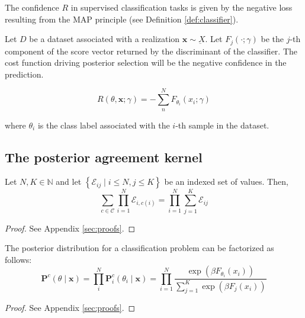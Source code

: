 The confidence $R$ in supervised classification tasks is given by the negative
loss resulting from the MAP principle (see Definition \ref{def:classifier}).

\begin{definition}
    Let $D$ be a dataset associated with a realization $\bm{x} \sim \underbar{X}$. Let $F_j(\cdot; \gamma)$ 
    be the $j$-th component of the score vector returned by the discriminant of the classifier.
    The cost function driving posterior selection will be the negative
    confidence in the prediction.

    $$
    R(\theta, \bm{x}; \gamma) = - \sum_n^N F_{\theta_i}(x_i; \gamma)
    $$

    where $\theta_i$ is the class label associated with the $i$-th sample in the dataset.
\end{definition}

\subsection{The posterior agreement kernel}

\begin{lemma}[Exchangeability]\label{lemma:exchangeability} 
    Let $N, K \in \mathbb{N}$ and let $\left\{\mathcal{E}_{i j} \mid i \leq N, j \leq K\right\}$ be an indexed set of values. Then,
    $$
    \sum_{c \in \mathcal{C}} \prod_{i=1}^N \mathcal{E}_{i, c(i)}=\prod_{i=1}^N \sum_{j=1}^K \mathcal{E}_{i j}
    $$
\end{lemma}

\begin{proof}
    See Appendix \ref{sec:proofs}.
\end{proof}

\begin{theorem}\label{theorem:posterior_factorization}

    The posterior distribution for a classification problem can be factorized as follows:
    $$
    \mathbf{P}^c(\theta \mid \bm{x}) = \prod_i^N  \mathbf{P}_i^c(\theta_i \mid \bm{x}) = \prod_{i=1}^N \frac{\exp \left ( \beta F_{\theta_i}(x_i) \right )}{\sum_{j=1}^K \exp \left ( \beta F_j(x_i) \right )}
    $$
\end{theorem}

\begin{proof}
    See Appendix \ref{sec:proofs}.
\end{proof}

